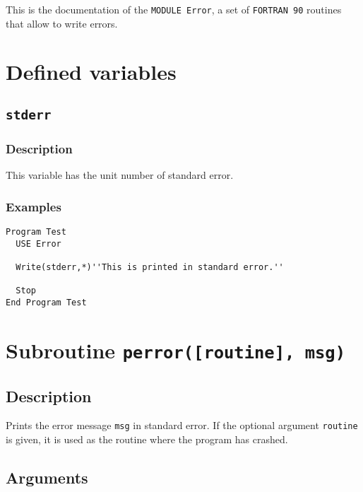 This is the documentation of the \texttt{MODULE Error}, a set
of \texttt{FORTRAN 90} routines that allow to write errors.


\section{Defined variables}

\subsection{\texttt{stderr}}

\subsubsection{Description}

This variable has the unit number of standard error.

\subsubsection{Examples}
\begin{lstlisting}[emph=stderr,
                   emphstyle=\color{blue},
                   frame=trBL,
                   caption=Standard error unit.,
                   label=stderr]
Program Test
  USE Error

  Write(stderr,*)''This is printed in standard error.''

  Stop
End Program Test
\end{lstlisting}


\section{Subroutine \texttt{perror([routine], msg)}}

\subsection{Description}

Prints the error message \texttt{msg} in standard error. If the
optional argument \texttt{routine} is given, it is used as the routine
where the program has crashed.

\subsection{Arguments}

